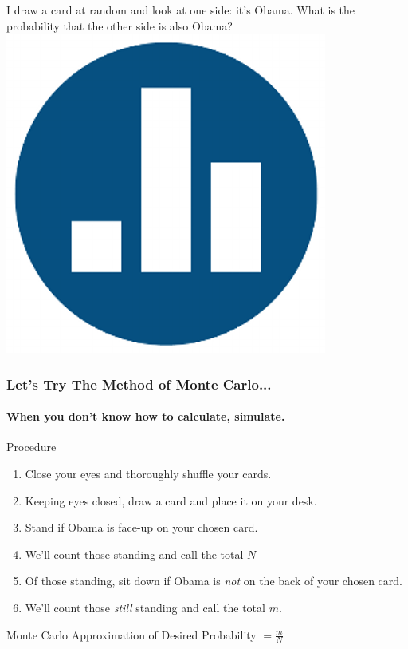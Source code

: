 \documentclass[handout]{beamer}
\begin{document}
\begin{frame}
\begin{alertblock}{I draw a card at random and look at one side: it's Obama. What is the probability that the other side is also Obama?\\\hfill\includegraphics[scale = 0.05]{./images/clicker} }\end{alertblock}
\end{frame}
\begin{frame}
\frametitle{Let's Try The Method of Monte Carlo...}
\framesubtitle{When you don't know how to calculate, simulate.}
Procedure
\begin{enumerate}
\item Close your eyes and thoroughly shuffle your cards.
\item Keeping eyes closed, draw a card and place it on your desk.
\item Stand if Obama is face-up on your chosen card. 
\item We'll count those standing and call the total $N$
\item Of those standing, sit down if Obama is \emph{not} on the back of your chosen card.
\item We'll count those \emph{still} standing and call the total $m$.
\end{enumerate}

\begin{alertblock}{Monte Carlo Approximation of Desired Probability $\displaystyle= \frac{m}{N}$}\end{alertblock}
\end{frame}
\end{document}
